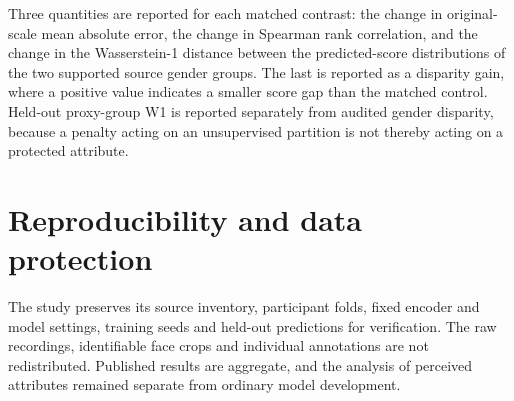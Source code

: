 Three quantities are reported for each matched contrast: the change in original-scale
mean absolute error, the change in Spearman rank correlation, and the change in the
Wasserstein-1 distance between the predicted-score distributions of the two supported
source gender groups. The last is reported as a disparity gain, where a positive value
indicates a smaller score gap than the matched control. Held-out proxy-group W1 is
reported separately from audited gender disparity, because a penalty acting on an
unsupervised partition is not thereby acting on a protected attribute.

\section{Reproducibility and data protection}

The study preserves its source inventory, participant folds, fixed encoder and model settings,
training seeds and held-out predictions for verification. The raw recordings, identifiable face
crops and individual annotations are not redistributed. Published results are aggregate, and
the analysis of perceived attributes remained separate from ordinary model development.
